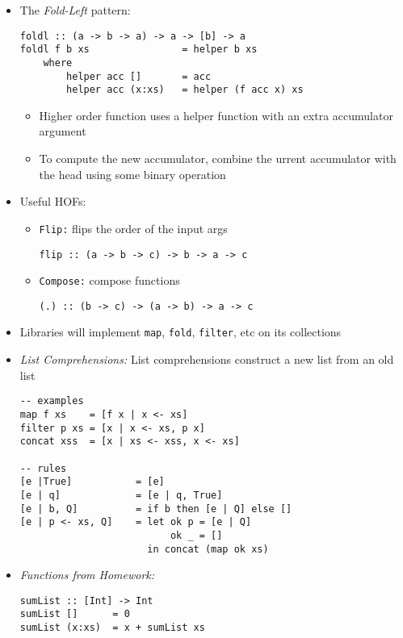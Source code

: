 \documentclass[landscape,8pt]{extarticle}
\newcommand{\code}{\lstinline}
\begin{document}
\begin{multicols}{3}
\begin{itemize}
\begin{itemize}
                  \item \code{cat = foldr (\x n -> x ++ n) ""}
              \end{itemize}
        \item The \emph{Fold-Left} pattern:
              \begin{lstlisting}
foldl :: (a -> b -> a) -> a -> [b] -> a
foldl f b xs                = helper b xs
    where
        helper acc []       = acc
        helper acc (x:xs)   = helper (f acc x) xs
            \end{lstlisting}
              \begin{itemize}
                  \item Higher order function uses a helper function with an extra accumulator argument
                  \item To compute the new accumulator, combine the urrent accumulator with the head using some binary operation
              \end{itemize}
        \item Useful HOFs:
              \begin{itemize}
                  \item \code{Flip:} flips the order of the input args
                        \begin{lstlisting}
flip :: (a -> b -> c) -> b -> a -> c
                \end{lstlisting}
                  \item \code{Compose:} compose functions
                        \begin{lstlisting}
(.) :: (b -> c) -> (a -> b) -> a -> c
                \end{lstlisting}
              \end{itemize}
        \item Libraries will implement \code{map}, \code{fold}, \code{filter}, etc on its collections
        \item \emph{List Comprehensions:} List comprehensions construct a new list from an old list
              \begin{lstlisting}
-- examples
map f xs    = [f x | x <- xs]
filter p xs = [x | x <- xs, p x]
concat xss  = [x | xs <- xss, x <- xs]

-- rules
[e |True]           = [e]
[e | q]             = [e | q, True]
[e | b, Q]          = if b then [e | Q] else []
[e | p <- xs, Q]    = let ok p = [e | Q]
                          ok _ = []
                      in concat (map ok xs)
            \end{lstlisting}
        \item \emph{Functions from Homework:}
              \begin{lstlisting}
sumList :: [Int] -> Int
sumList []      = 0
sumList (x:xs)  = x + sumList xs
\end{lstlisting}


\end{itemize}
\end{multicols}
\end{document}
